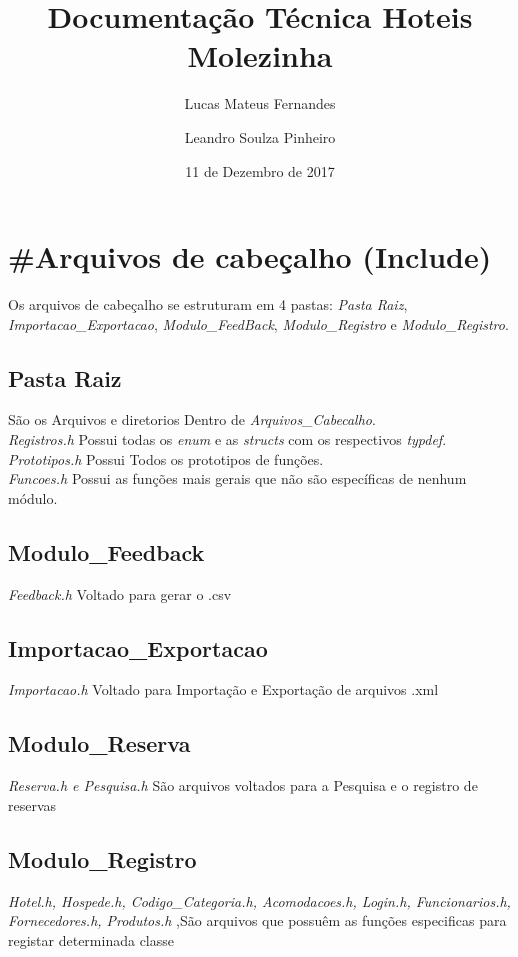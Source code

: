 \documentclass{article}
\title{Documentação Técnica Hoteis Molezinha}
\date{11 de Dezembro de 2017}
\author{Lucas Mateus Fernandes \and Leandro Soulza Pinheiro}
\begin{document}
  \maketitle
  \newpage
  \tableofcontents %
  \newpage


  \section{\#Arquivos de cabeçalho (Include)}
    Os arquivos de cabeçalho se estruturam em 4 pastas: \textit{ Pasta Raiz}, \textit{Importacao\_Exportacao}, \textit{Modulo\_FeedBack}, \textit{Modulo\_Registro} e \textit{Modulo\_Registro}.
    \subsection{Pasta Raiz}
      São os Arquivos e diretorios Dentro de  \textit{Arquivos\_Cabecalho}.\\
      \textit{Registros.h} Possui todas os  \textit{enum} e as \textit{structs} com os respectivos \textit{typdef}.\\
      \textit{Prototipos.h} Possui Todos os prototipos de funções.\\ 
      \textit{Funcoes.h} Possui as funções mais gerais que não são específicas de nenhum módulo.\\
    \subsection{Modulo\_Feedback}
      \textit{Feedback.h} Voltado para gerar o .csv\\
    \subsection{Importacao\_Exportacao}
      \textit{Importacao.h} Voltado para Importação e Exportação de arquivos .xml\\
    \subsection{Modulo\_Reserva}
      \textit{Reserva.h e Pesquisa.h} São arquivos voltados para a Pesquisa e o registro de reservas\\
    \subsection{Modulo\_Registro}
      \textit{Hotel.h, Hospede.h, Codigo\_Categoria.h, Acomodacoes.h, Login.h, Funcionarios.h, Fornecedores.h, Produtos.h} ,São arquivos que possuêm as funções especificas para registar determinada classe\\
\end{document}
